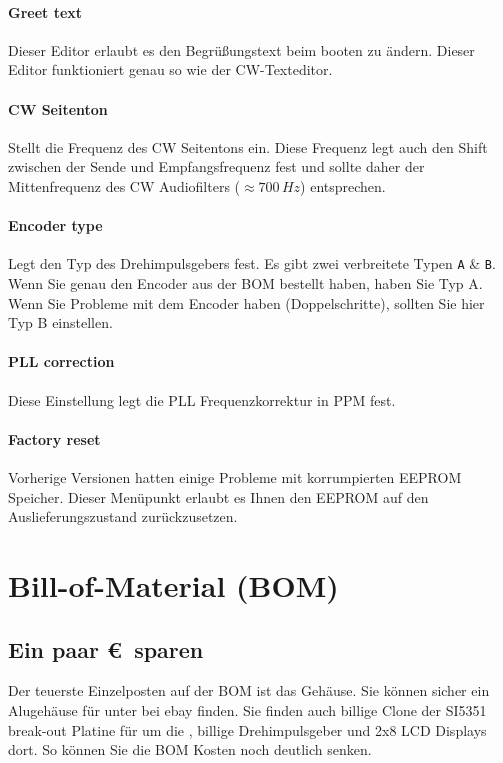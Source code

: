 \documentclass[10pt, a4paper,twoside]{scrartcl}
\begin{document}
\paragraph{Greet text}
Dieser Editor erlaubt es den Begrüßungstext beim booten zu ändern. Dieser Editor funktioniert genau so wie der CW-Texteditor.

\paragraph{CW Seitenton}
Stellt die Frequenz des CW Seitentons ein. Diese Frequenz legt auch den Shift zwischen der Sende und Empfangsfrequenz fest und sollte daher der Mittenfrequenz des CW Audiofilters ($\approx 700\,Hz$) entsprechen.

\paragraph{Encoder type}
Legt den Typ des Drehimpulsgebers fest. Es gibt zwei verbreitete Typen \texttt{A} \& \texttt{B}. Wenn Sie genau den Encoder aus der BOM bestellt haben, haben Sie Typ A. Wenn Sie Probleme mit dem Encoder haben (Doppelschritte), sollten Sie hier Typ B einstellen.

\paragraph{PLL correction}
Diese Einstellung legt die PLL Frequenzkorrektur in PPM fest.

\paragraph{Factory reset}
Vorherige Versionen hatten einige Probleme mit korrumpierten EEPROM Speicher. Dieser Menüpunkt erlaubt es Ihnen den EEPROM auf den Auslieferungszustand zurückzusetzen.


\cleardoublepage
\section{Bill-of-Material (BOM)}


\subsection{Ein paar \euro\ sparen}
Der teuerste Einzelposten auf der BOM ist das Gehäuse. Sie können sicher ein Alugehäuse für unter  bei ebay finden. Sie finden auch billige Clone der SI5351 break-out Platine für um die , billige Drehimpulsgeber und 2x8 LCD Displays dort. So können Sie die BOM Kosten noch deutlich senken.
\end{document}

